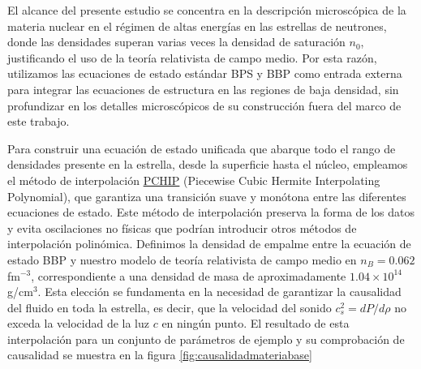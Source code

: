 El alcance del presente estudio se concentra en la descripción microscópica de la materia nuclear en el régimen de altas energías en las estrellas de neutrones, donde las densidades superan varias veces la densidad de saturación $n_0$, justificando el uso de la teoría relativista de campo medio. Por esta razón, utilizamos las ecuaciones de estado estándar BPS y BBP como entrada externa para integrar las ecuaciones de estructura en las regiones de baja densidad, sin profundizar en los detalles microscópicos de su construcción fuera del marco de este trabajo.

Para construir una ecuación de estado unificada que abarque todo el rango de densidades presente en la estrella, desde la superficie hasta el núcleo, empleamos el método de interpolación \href{https://es.wikipedia.org/wiki/Interpolador_c\%C3\%BAbico_de_Hermite}{PCHIP} (Piecewise Cubic Hermite Interpolating Polynomial), que garantiza una transición suave y monótona entre las diferentes ecuaciones de estado. Este método de interpolación preserva la forma de los datos y evita oscilaciones no físicas que podrían introducir otros métodos de interpolación polinómica. Definimos la densidad de empalme entre la ecuación de estado BBP y nuestro modelo de teoría relativista de campo medio en $n_B = 0.062$ fm$^{-3}$, correspondiente a una densidad de masa de aproximadamente $1.04 \times 10^{14}$ g/cm$^3$. Esta elección se fundamenta en la necesidad de garantizar la causalidad del fluido en toda la estrella, es decir, que la velocidad del sonido $c^2_s = dP/d\rho$ no exceda la velocidad de la luz $c$ en ningún punto. El resultado de esta interpolación para un conjunto de parámetros de ejemplo y su comprobación de causalidad se muestra en la figura \ref{fig:causalidadmateriabase}

